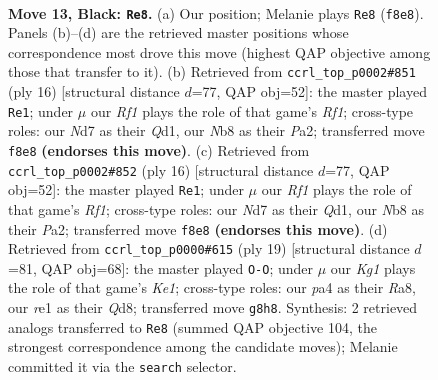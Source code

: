\documentclass[11pt]{article}
\begin{document}
\begin{figure}[p]\centering
\begin{subfigure}{0.46\textwidth}\centering
\resizebox{\linewidth}{!}{%
\newchessgame
\chessboard[
  setfen={rnbq1rk1/pp1n1pb1/4p1pp/3p4/P2P4/1B1Q1N1P/RPP2PP1/1NB1R1K1 b - - 0 13},
  showmover=false,
  pgfstyle=straightmove, color=movearrow, markmove={f8-e8}
]}
\caption{}
\end{subfigure}\hfill
\begin{subfigure}{0.46\textwidth}\centering
\resizebox{\linewidth}{!}{%
\newchessgame
\chessboard[
  setfen={r1b1k2r/ppq1ppbp/2n3pn/3p4/3P4/2PB1N1P/PP3PP1/RNBQ1RK1 w kq - 4 9},
  showmover=false,
  pgfstyle=straightmove, color=movearrow, markmove={f1-e1}
]}
\caption{}
\end{subfigure}
\\[4pt]
\begin{subfigure}{0.46\textwidth}\centering
\resizebox{\linewidth}{!}{%
\newchessgame
\chessboard[
  setfen={r1b1k2r/ppq1ppbp/2n3pn/3p4/3P4/2PB1N1P/PP3PP1/RNBQ1RK1 w kq - 4 9},
  showmover=false,
  pgfstyle=straightmove, color=movearrow, markmove={f1-e1}
]}
\caption{}
\end{subfigure}\hfill
\begin{subfigure}{0.46\textwidth}\centering
\resizebox{\linewidth}{!}{%
\newchessgame
\chessboard[
  setfen={rn1qk2r/pb2bpp1/1pp1pn1p/8/2QPP3/P1N1BN2/1P3PPP/R3KB1R b KQkq - 1 10},
  showmover=false,
  pgfstyle=straightmove, color=movearrow, markmove={e8-g8}
]}
\caption{}
\end{subfigure}
\caption{\textbf{Move 13, Black: \texttt{Re8}.} (a) Our position; Melanie plays \texttt{Re8} (\texttt{f8e8}). Panels (b)--(d) are the retrieved master positions whose correspondence most drove this move (highest QAP objective among those that transfer to it). (b) Retrieved from \texttt{ccrl\_top\_p0002\#851} (ply 16) [structural distance $d$=77, QAP obj=52]: the master played \texttt{Re1}; under $\mu$ our \emph{Rf1} plays the role of that game's \emph{Rf1}; cross-type roles: our \emph{N}d7 as their \emph{Q}d1, our \emph{N}b8 as their \emph{P}a2; transferred move \texttt{f8e8} \textbf{(endorses this move)}. (c) Retrieved from \texttt{ccrl\_top\_p0002\#852} (ply 16) [structural distance $d$=77, QAP obj=52]: the master played \texttt{Re1}; under $\mu$ our \emph{Rf1} plays the role of that game's \emph{Rf1}; cross-type roles: our \emph{N}d7 as their \emph{Q}d1, our \emph{N}b8 as their \emph{P}a2; transferred move \texttt{f8e8} \textbf{(endorses this move)}. (d) Retrieved from \texttt{ccrl\_top\_p0000\#615} (ply 19) [structural distance $d$=81, QAP obj=68]: the master played \texttt{O-O}; under $\mu$ our \emph{Kg1} plays the role of that game's \emph{Ke1}; cross-type roles: our \emph{p}a4 as their \emph{R}a8, our \emph{r}e1 as their \emph{Q}d8; transferred move \texttt{g8h8}. Synthesis: 2 retrieved analogs transferred to \texttt{Re8} (summed QAP objective 104, the strongest correspondence among the candidate moves); Melanie committed it via the \texttt{search} selector.}
\label{fig:thought-m25}
\end{figure}
\end{document}
